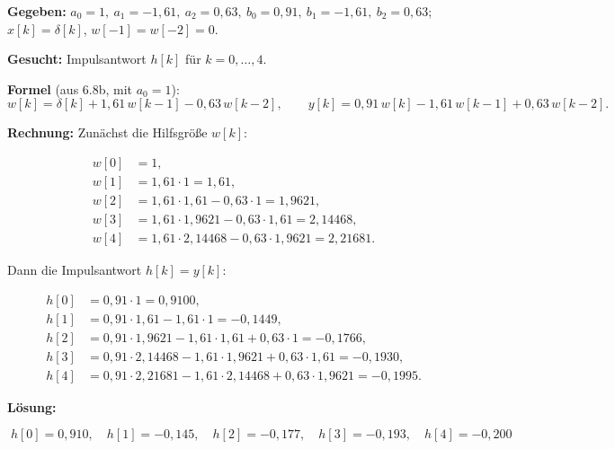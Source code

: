 \begin{beispiel}

\textbf{Gegeben:} $a_0=1,\ a_1=-1{,}61,\ a_2=0{,}63,\
b_0=0{,}91,\ b_1=-1{,}61,\ b_2=0{,}63$; $x[k]=\delta[k]$,
$w[-1]=w[-2]=0$.

\textbf{Gesucht:} Impulsantwort $h[k]$ für $k=0,\dots,4$.

\textbf{Formel} (aus 6.8b, mit $a_0=1$):
$$
w[k]=\delta[k]+1{,}61\,w[k-1]-0{,}63\,w[k-2],\qquad
y[k]=0{,}91\,w[k]-1{,}61\,w[k-1]+0{,}63\,w[k-2].
$$

\textbf{Rechnung:} Zunächst die Hilfsgröße $w[k]$:

$$
\begin{aligned}
w[0]&=1,\\
w[1]&=1{,}61\cdot1=1{,}61,\\
w[2]&=1{,}61\cdot1{,}61-0{,}63\cdot1=1{,}9621,\\
w[3]&=1{,}61\cdot1{,}9621-0{,}63\cdot1{,}61=2{,}14468,\\
w[4]&=1{,}61\cdot2{,}14468-0{,}63\cdot1{,}9621=2{,}21681.
\end{aligned}
$$

Dann die Impulsantwort $h[k]=y[k]$:

$$
\begin{aligned}
h[0]&=0{,}91\cdot1=0{,}9100,\\
h[1]&=0{,}91\cdot1{,}61-1{,}61\cdot1=-0{,}1449,\\
h[2]&=0{,}91\cdot1{,}9621-1{,}61\cdot1{,}61+0{,}63\cdot1=-0{,}1766,\\
h[3]&=0{,}91\cdot2{,}14468-1{,}61\cdot1{,}9621+0{,}63\cdot1{,}61=-0{,}1930,\\
h[4]&=0{,}91\cdot2{,}21681-1{,}61\cdot2{,}14468+0{,}63\cdot1{,}9621=-0{,}1995.
\end{aligned}
$$

\textbf{Lösung:}

$$
\boxed{\;
h[0]=0{,}910,\quad h[1]=-0{,}145,\quad h[2]=-0{,}177,\quad
h[3]=-0{,}193,\quad h[4]=-0{,}200
\;}
$$

\begin{center}
\end{center}

\end{beispiel}
